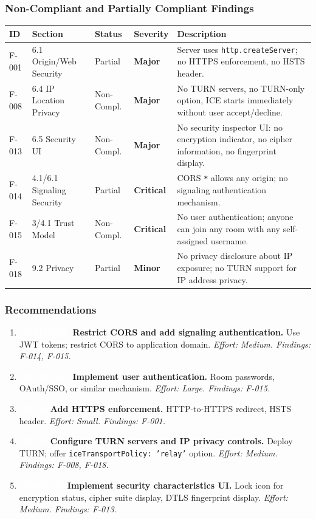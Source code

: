 \documentclass[11pt,letterpaper]{article}
\newcommand{\sevcritical}{\textcolor{critical}{\textbf{Critical}}}
\newcommand{\sevmajor}{\textcolor{major}{\textbf{Major}}}
\newcommand{\sevminor}{\textcolor{minor!80!black}{\textbf{Minor}}}
\newcommand{\pricritical}{\colorbox{critical}{\textcolor{white}{\small\textbf{CRITICAL}}}}
\newcommand{\prihigh}{\colorbox{major}{\textcolor{white}{\small\textbf{HIGH}}}}
\newcommand{\primedium}{\colorbox{minor!80!black}{\textcolor{white}{\small\textbf{MEDIUM}}}}
\begin{document}
\subsubsection{Non-Compliant and Partially Compliant Findings}

\begin{longtable}{C{1cm}L{2.8cm}C{1.5cm}C{1.2cm}L{6.7cm}}
\toprule
\textbf{ID} & \textbf{Section} & \textbf{Status} & \textbf{Severity} & \textbf{Description} \\
\midrule
\endhead
F-001 & 6.1 Origin/Web Security & Partial & \sevmajor & Server uses \texttt{http.createServer}; no HTTPS enforcement, no HSTS header. \\
\midrule
F-008 & 6.4 IP Location Privacy & Non-Compl. & \sevmajor & No TURN servers, no TURN-only option, ICE starts immediately without user accept/decline. \\
\midrule
F-013 & 6.5 Security UI & Non-Compl. & \sevmajor & No security inspector UI: no encryption indicator, no cipher information, no fingerprint display. \\
\midrule
F-014 & 4.1/6.1 Signaling Security & Partial & \sevcritical & CORS \texttt{*} allows any origin; no signaling authentication mechanism. \\
\midrule
F-015 & 3/4.1 Trust Model & Non-Compl. & \sevcritical & No user authentication; anyone can join any room with any self-assigned username. \\
\midrule
F-018 & 9.2 Privacy & Partial & \sevminor & No privacy disclosure about IP exposure; no TURN support for IP address privacy. \\
\bottomrule
\end{longtable}

\subsubsection{Recommendations}

\begin{enumerate}[leftmargin=2em]
    \item \pricritical\ \textbf{Restrict CORS and add signaling authentication.} Use JWT tokens; restrict CORS to application domain. \textit{Effort: Medium. Findings: F-014, F-015.}
    \item \pricritical\ \textbf{Implement user authentication.} Room passwords, OAuth/SSO, or similar mechanism. \textit{Effort: Large. Findings: F-015.}
    \item \prihigh\ \textbf{Add HTTPS enforcement.} HTTP-to-HTTPS redirect, HSTS header. \textit{Effort: Small. Findings: F-001.}
    \item \prihigh\ \textbf{Configure TURN servers and IP privacy controls.} Deploy TURN; offer \texttt{iceTransportPolicy: 'relay'} option. \textit{Effort: Medium. Findings: F-008, F-018.}
    \item \primedium\ \textbf{Implement security characteristics UI.} Lock icon for encryption status, cipher suite display, DTLS fingerprint display. \textit{Effort: Medium. Findings: F-013.}
\end{enumerate}
\end{document}
